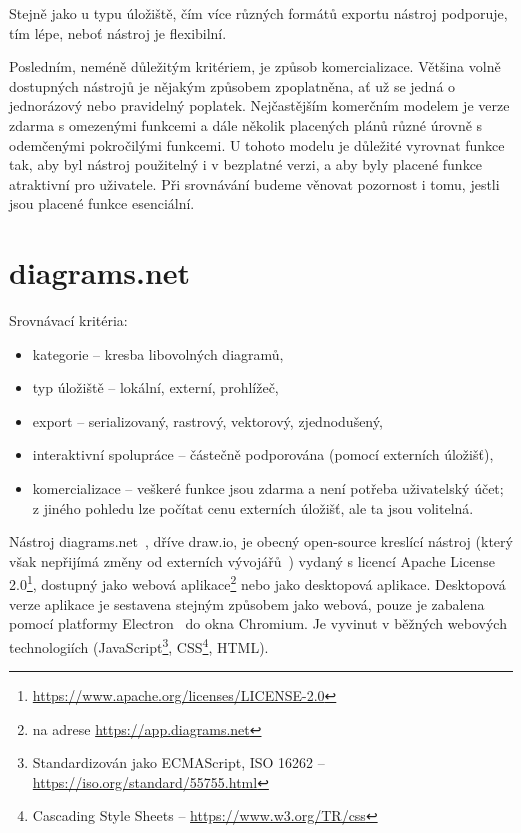 Stejně jako u typu úložiště, čím více různých formátů exportu nástroj podporuje, tím lépe, neboť nástroj je flexibilní.

Posledním, neméně důležitým kritériem, je způsob komercializace.
Většina volně dostupných nástrojů je nějakým způsobem zpoplatněna, ať už se jedná o jednorázový nebo pravidelný poplatek.
Nejčastějším komerčním modelem je verze zdarma s omezenými funkcemi a dále několik placených plánů různé úrovně s odemčenými pokročilými funkcemi.
U tohoto modelu je důležité vyrovnat funkce tak, aby byl nástroj použitelný i v bezplatné verzi, a aby byly placené funkce atraktivní pro uživatele.
Při srovnávání budeme věnovat pozornost i tomu, jestli jsou placené funkce esenciální.

\section{diagrams.net}\label{section:drawio}

Srovnávací kritéria:
\begin{itemize}
  \item kategorie -- kresba libovolných diagramů,
  \item typ úložiště -- lokální, externí, prohlížeč,
  \item export -- serializovaný, rastrový, vektorový, zjednodušený,
  \item interaktivní spolupráce -- částečně podporována (pomocí externích úložišť),
  \item komercializace -- veškeré funkce jsou zdarma a není potřeba uživatelský účet;
        z jiného pohledu lze počítat cenu externích úložišť, ale ta jsou volitelná.
\end{itemize}

Nástroj diagrams.net~\cite{drawio_2023}, dříve draw.io, je obecný open-source kreslící nástroj
(který však nepřijímá změny od externích vývojářů~\cite{drawio_gh_2022}) %
vydaný s licencí Apache License 2.0\footnote{\url{https://www.apache.org/licenses/LICENSE-2.0}}, dostupný jako webová aplikace\footnote{na adrese \url{https://app.diagrams.net}} nebo jako desktopová aplikace.
Desktopová verze aplikace je sestavena stejným způsobem jako webová, pouze je zabalena pomocí platformy Electron~\cite{openjsfoundation_electron_2023} do okna Chromium.
Je vyvinut v běžných we\-bo\-vých tech\-no\-lo\-gi\-ích (Java\-Script\footnote{Standardizován jako ECMAScript, ISO 16262 -- \url{https://iso.org/standard/55755.html}}, CSS\footnote{Cascading Style Sheets -- \url{https://www.w3.org/TR/css}}, HTML).

